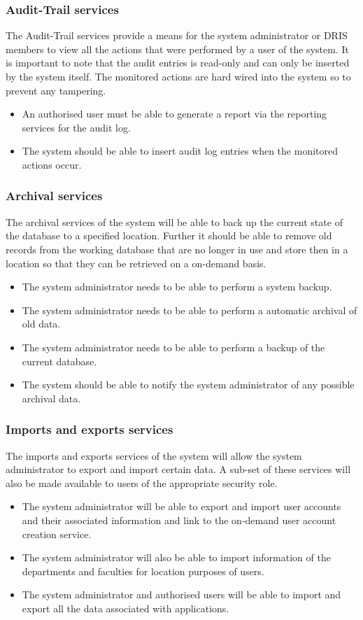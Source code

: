 \documentclass[12pt]{article}
\begin{document}
\subsubsection{Audit-Trail services}
	The Audit-Trail services provide a means for the system administrator or DRIS members to view all the actions that were performed by a user of the system. It is important to note that the audit entries is read-only and can only be inserted by the system itself. The monitored actions are hard wired into the system so to prevent any tampering.
	\begin{itemize}
		\item An authorised user must be able to generate a report via the reporting services for the audit log.
		\item The system should be able to insert audit log entries when the monitored actions occur.
	\end{itemize}
\subsubsection{Archival services}
	The archival services of the system will be able to back up the current state of the database to a specified location. Further it should be able to remove old records from the working database that are no longer in use and store then in a location so that they can be retrieved on a on-demand basis.
	\begin{itemize}
		\item The system administrator needs to be able to perform a system backup.
		\item The system administrator needs to be able to perform a automatic archival of old data.
		\item The system administrator needs to be able to perform a backup of the current database.
		\item The system should be able to notify the system administrator of any possible archival data.
	\end{itemize}
\subsubsection{Imports and exports services}
	The imports and exports services of the system will allow the system administrator to export and import certain data. A sub-set of these services will also be made available to users of the appropriate security role.
	\begin{itemize}		
		\item The system administrator will be able to export and import user accounts and their associated information and link to the on-demand user account creation service.
		\item The system administrator will also be able to import information of the departments and faculties for location purposes of users.
		\item The system administrator and authorised users will be able to import and export all the data associated with applications.
	\end{itemize}
\vspace{0.2in}
\end{document}
